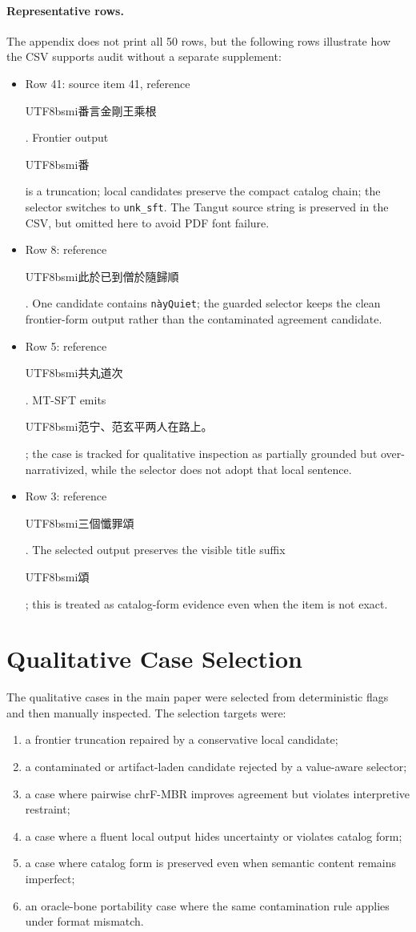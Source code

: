 \documentclass{article}
\newcommand{\zh}[1]{{\begin{CJK*}{UTF8}{bsmi}#1\end{CJK*}}}
\newcommand{\code}[1]{\texttt{#1}}
\begin{document}
\paragraph{Representative rows.}
The appendix does not print all 50 rows, but the following rows illustrate how the CSV supports audit without a separate supplement:
\begin{itemize}
    \item Row 41: source item 41, reference \zh{番言金剛王乘根}. Frontier output \zh{番} is a truncation; local candidates preserve the compact catalog chain; the selector switches to \code{unk\_sft}. The Tangut source string is preserved in the CSV, but omitted here to avoid PDF font failure.
    \item Row 8: reference \zh{此於已到僧於隨歸順}. One candidate contains \texttt{n\`ayQuiet}; the guarded selector keeps the clean frontier-form output rather than the contaminated agreement candidate.
    \item Row 5: reference \zh{共丸道次}. MT-SFT emits \zh{范宁、范玄平两人在路上。}; the case is tracked for qualitative inspection as partially grounded but over-narrativized, while the selector does not adopt that local sentence.
    \item Row 3: reference \zh{三個懺罪頌}. The selected output preserves the visible title suffix \zh{頌}; this is treated as catalog-form evidence even when the item is not exact.
\end{itemize}

\section{Qualitative Case Selection}

The qualitative cases in the main paper were selected from deterministic flags and then manually inspected. The selection targets were:
\begin{enumerate}
    \item a frontier truncation repaired by a conservative local candidate;
    \item a contaminated or artifact-laden candidate rejected by a value-aware selector;
    \item a case where pairwise chrF-MBR improves agreement but violates interpretive restraint;
    \item a case where a fluent local output hides uncertainty or violates catalog form;
    \item a case where catalog form is preserved even when semantic content remains imperfect;
    \item an oracle-bone portability case where the same contamination rule applies under format mismatch.
\end{enumerate}
\end{document}
